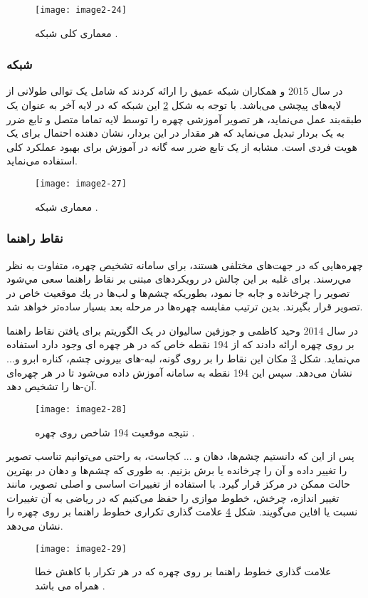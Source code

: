 \begin{figure}[h]
\centering
  \texttt{[image: image2-24]}
  \caption{معماری کلی شبکه  \cite{7298594}.}
  \label{image2-24}
\end{figure}

\subsubsection{	شبکه }
در سال 2015  و همکاران \cite{parkhi2015deep} شبکه عمیق  را ارائه کردند که شامل یک توالی طولانی از لایه‌های پیچشی می‌باشد. با توجه به شکل \ref{image2-27} این شبکه که در لایه آخر به عنوان یک طبقه‌بند عمل می‌نماید، هر تصویر آموزشی چهره را توسط لایه تماما متصل و تابع ضرر  به یک بردار تبدیل می‌نماید که هر مقدار در این بردار، نشان دهنده احتمال برای یک هویت فردی است.  مشابه  از یک تابع ضرر سه گانه  در آموزش برای بهبود عملکرد کلی استفاده می‌نماید.
 
\begin{figure}[h]
\centering
  \texttt{[image: image2-27]}
  \caption{معماری شبکه  \cite{parkhi2015deep}.}
  \label{image2-27}
\end{figure}

\subsubsection{نقاط راهنما} 
چهره‌هايى كه در جهت‌هاى مختلفى هستند، براى سامانه تشخیص چهره، متفاوت به نظر مي‌رسند. براى غلبه بر اين چالش در رویکردهای مبتنی بر نقاط راهنما سعى مي‌شود تصوير را چرخانده و جابه جا نمود، بطوريكه چشم‌ها و لب‌ها در يك موقعيت خاص در تصوير قرار بگیرند. بدین ترتیب مقايسه چهره‌ها در مرحله بعد بسيار ساده‌تر خواهد شد.

\noindent 
در سال 2014 وحيد كاظمى و جوزفين ساليوان در \cite{6909637} یک الگوریتم برای یافتن نقاط راهنما  بر روی چهره ارائه دادند كه از 194 نقطه خاص كه در هر چهره اى وجود دارد استفاده مي‌نماید. شکل \ref{image2-28} مکان این نقاط را بر روی گونه، لبه-هاى بیرونی چشم، كناره ابرو و... نشان می‌دهد. سپس اين 194 نقطه به سامانه آموزش داده می‌شود تا در هر چهره‌اى آن-ها را تشخيص دهد. 
\begin{figure}[h]
\centering
  \texttt{[image: image2-28]}
  \caption{نتیجه موقعیت 194 شاخص روی چهره \cite{6909637}.}
  \label{image2-28}
\end{figure}

\noindent
پس از این که دانستیم چشم‌ها، دهان و ... کجاست، به راحتی می‌توانیم تناسب تصویر را تغییر داده و آن را چرخانده یا برش بزنیم. به طوری که چشم‌ها و دهان در بهترین حالت ممکن در مرکز قرار گیرد. با استفاده از تغییرات اساسی و اصلی تصویر، مانند تغییر اندازه، چرخش، خطوط موازی را حفظ می‌کنیم که در ریاضی به آن تغییرات نسبت یا افاین می‌گویند. شکل \ref{image2-29} علامت گذاری تکراری خطوط راهنما بر روی چهره را نشان می‌دهد. 
\begin{figure}[h]
\centering
  \texttt{[image: image2-29]}
  \caption{علامت گذاری خطوط راهنما بر روی چهره که در هر تکرار با کاهش خطا همراه می باشد \cite{6909637}.}
  \label{image2-29}
\end{figure}

